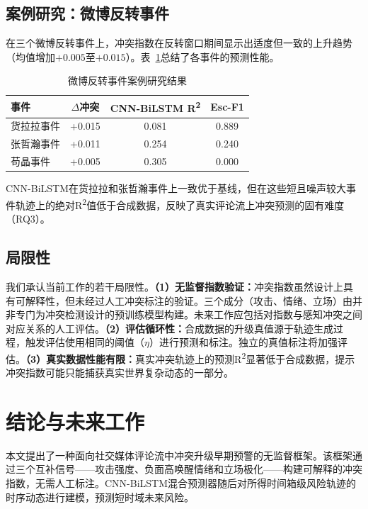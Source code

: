 \documentclass[conference]{IEEEtran}
\begin{document}
\subsection{案例研究：微博反转事件}

在三个微博反转事件上，冲突指数在反转窗口期间显示出适度但一致的上升趋势（均值增加$+0.005$至$+0.015$）。表~\ref{tab:case_study}总结了各事件的预测性能。

\begin{table}[h]
\caption{微博反转事件案例研究结果}
\label{tab:case_study}
\centering
\begin{tabular}{lccc}
\hline
\textbf{事件} & \textbf{$\Delta$冲突} & \textbf{CNN-BiLSTM R\textsuperscript{2}} & \textbf{Esc-F1} \\
\hline
货拉拉事件 & +0.015 & 0.081 & 0.889 \\
张哲瀚事件 & +0.011 & 0.254 & 0.240 \\
苟晶事件 & +0.005 & 0.305 & 0.000 \\
\hline
\end{tabular}
\end{table}

\noindent CNN-BiLSTM在货拉拉和张哲瀚事件上一致优于基线，但在这些短且噪声较大事件轨迹上的绝对R\textsuperscript{2}值低于合成数据，反映了真实评论流上冲突预测的固有难度（RQ3）。

\subsection{局限性}

我们承认当前工作的若干局限性。\textbf{（1）无监督指数验证：}冲突指数虽然设计上具有可解释性，但未经过人工冲突标注的验证。三个成分（攻击、情绪、立场）由并非专门为冲突检测设计的预训练模型构建。未来工作应包括对指数与感知冲突之间对应关系的人工评估。\textbf{（2）评估循环性：}合成数据的升级真值源于轨迹生成过程，触发评估使用相同的阈值（$\eta$）进行预测和标注。独立的真值标注将加强评估。\textbf{（3）真实数据性能有限：}真实冲突轨迹上的预测R\textsuperscript{2}显著低于合成数据，提示冲突指数可能只能捕获真实世界复杂动态的一部分。

\section{结论与未来工作}

本文提出了一种面向社交媒体评论流中冲突升级早期预警的无监督框架。该框架通过三个互补信号——攻击强度、负面高唤醒情绪和立场极化——构建可解释的冲突指数，无需人工标注。CNN-BiLSTM混合预测器随后对所得时间箱级风险轨迹的时序动态进行建模，预测短时域未来风险。
\end{document}
